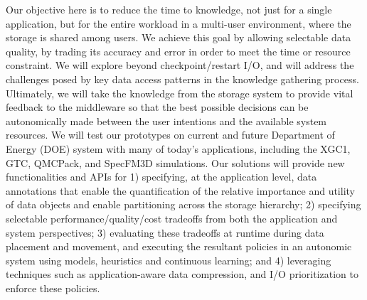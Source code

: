 Our objective here is to reduce the time to knowledge, not just for a single
application, but for the entire workload in a multi-user environment, where
the storage is shared among users.
We achieve this goal by allowing selectable data quality, by trading its accuracy and error
in order to meet the time or resource constraint. 
We will explore beyond 
checkpoint/restart I/O, and will address the challenges posed by 
key
data access patterns in the knowledge gathering process.
Ultimately, we will take the knowledge from the storage system to provide vital feedback to the middleware 
so that the best possible decisions can be autonomically made between the user intentions and
the available system resources.  
We will test our prototypes  on current and future Department of Energy (DOE) system with many of today's applications, including the
XGC1, GTC, QMCPack, and SpecFM3D simulations. 
Our solutions will provide  new functionalities and APIs for
1) specifying, at the application level, data annotations that enable the
quantification of the relative importance and utility of data objects and
enable partitioning  across the storage hierarchy;
2) specifying selectable performance/quality/cost tradeoffs from both the
application and system perspectives;
3) evaluating these tradeoffs at runtime during data placement and movement,
and executing the resultant policies in an autonomic system using models,
heuristics and continuous learning; and
4) leveraging techniques such as application-aware data compression, 
and I/O prioritization to enforce these
policies.
\noindent

\vfill
